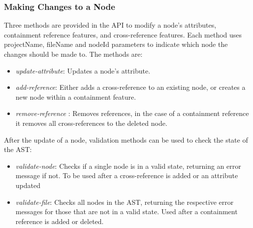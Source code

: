 \documentclass{article}
\begin{document}
{\subsubsection{Making Changes to a Node}
Three methods are provided in the API to modify a node's attributes, containment reference features, and cross-reference features. Each method uses projectName, fileName and nodeId parameters to indicate which node the changes should be made to. The methods are: 
\begin{itemize}
\item \emph{update-attribute}: Updates a node's attribute.
\item \emph{add-reference}: Either adds a cross-reference to an existing node, or creates a new node within a containment feature.
\item \emph{remove-reference} : Removes references, in the case of a containment reference it removes all cross-references to the deleted node.
\end{itemize} 
After the update of a node, validation methods can be used to check the state of the AST:
\begin{itemize}
\item \emph{validate-node}: Checks if a single node is in a valid state, returning an error message if not. To be used after a cross-reference is added or an attribute updated
\item \emph{validate-file}: Checks all nodes in the AST, returning the respective error messages for those that are not in a valid state. Used after a containment reference is added or deleted.
\end{itemize}

}
\end{document}
